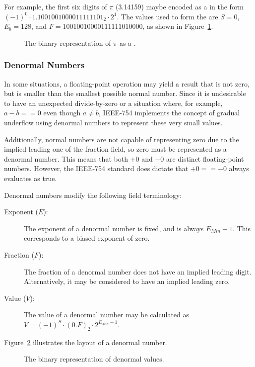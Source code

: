 For example, the first six digits of $\pi$ (3.14159) maybe encoded as a  in the form $(-1)^{0} \cdot 1.1001001000011111101_{2} \cdot 2^{1}$. The values used to form the  are $S=0$, $E_{b}=128$, and $F=10010010000111111010000$, as shown in Figure~\ref{figure:pi_example}.

\begin{figure}
	\centering
  \caption{The binary representation of $\pi$ as a .}
  \label{figure:pi_example}
\end{figure}

\subsubsection{Denormal Numbers}
\label{subsubsec:denormal}
In some situations, a floating-point operation may yield a result that is not zero, but is smaller than the smallest possible normal number. Since it is undesirable to have an unexpected divide-by-zero or a situation where, for example, $a - b == 0$ even though $a \neq b$, IEEE-754 implements the concept of gradual underflow using denormal numbers to represent these very small values.

Additionally, normal numbers are not capable of representing zero due to the implied leading one of the fraction field, so zero must be represented as a denormal number. This means that both $+0$ and $-0$ are distinct floating-point numbers. However, the IEEE-754 standard does dictate that $+0 == -0$ always evaluates as true.

Denormal numbers modify the following field terminology:

\begin{description}
	\item[Exponent ($E$):]
		The exponent of a denormal number is fixed, and is always $E_{Min} - 1$. This corresponds to a biased exponent of zero.
	\item[Fraction ($F$):]
		The fraction of a denormal number does not have an implied leading digit. Alternatively, it may be considered to have an implied leading zero.
	\item[Value ($V$):]
		The value of a denormal number may be calculated as $V = (-1)^{S} \cdot (0.F)_{2} \cdot 2^{E_{Min} - 1}$.
\end{description}

Figure~\ref{figure:denormal} illustrates the layout of a denormal number.

\begin{figure}
	\centering
  \caption{The binary representation of denormal  values.}
  \label{figure:denormal}
\end{figure}

